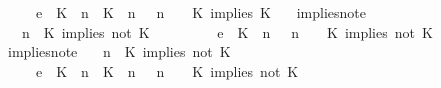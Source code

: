 \begin{isabellebody}
\ \ \ \ \ {\isasymhookrightarrow}\isactrlsub e\ \ {\isacharparenleft}{\isacharparenleft}{\isacharparenleft}K\ {\isasymUp}\ n{\isacharparenright}\ {\isacharhash}\ {\isacharparenleft}K\ {\isasymUp}\ n{\isacharparenright}\ {\isacharhash}\ {\isasymGamma}{\isacharparenright}{\isacharcomma}\ n\ {\isasymturnstile}\ {\isasymPsi}\ {\isasymtriangleright}\ {\isacharparenleft}{\isacharparenleft}K\ implies\ K\ {\isacharhash}\ {\isasymPhi}{\isacharparenright}{\isacharparenright}{\isachardoublequoteclose}\isanewline
{\isacharbar}\ implies{\isacharunderscore}not{\isacharunderscore}e{}{\isacharcolon}\isanewline
\ \ {\isachardoublequoteopen}{\isacharparenleft}{\isasymGamma}{\isacharcomma}\ n\ {\isasymturnstile}\ {\isacharparenleft}{\isacharparenleft}K\ implies\ not\ K\ {\isacharhash}\ {\isasymPsi}{\isacharparenright}\ {\isasymtriangleright}\ {\isasymPhi}{\isacharparenright}\isanewline
\ \ \ \ \ {\isasymhookrightarrow}\isactrlsub e\ \ {\isacharparenleft}{\isacharparenleft}{\isacharparenleft}K\ {\isasymnot}{\isasymUp}\ n{\isacharparenright}\ {\isacharhash}\ {\isasymGamma}{\isacharparenright}{\isacharcomma}\ n\ {\isasymturnstile}\ {\isasymPsi}\ {\isasymtriangleright}\ {\isacharparenleft}{\isacharparenleft}K\ implies\ not\ K\ {\isacharhash}\ {\isasymPhi}{\isacharparenright}{\isacharparenright}{\isachardoublequoteclose}\isanewline
{\isacharbar}\ implies{\isacharunderscore}not{\isacharunderscore}e{}{\isacharcolon}\isanewline
\ \ {\isachardoublequoteopen}{\isacharparenleft}{\isasymGamma}{\isacharcomma}\ n\ {\isasymturnstile}\ {\isacharparenleft}{\isacharparenleft}K\ implies\ not\ K\ {\isacharhash}\ {\isasymPsi}{\isacharparenright}\ {\isasymtriangleright}\ {\isasymPhi}{\isacharparenright}\isanewline
\ \ \ \ \ {\isasymhookrightarrow}\isactrlsub e\ \ {\isacharparenleft}{\isacharparenleft}{\isacharparenleft}K\ {\isasymUp}\ n{\isacharparenright}\ {\isacharhash}\ {\isacharparenleft}K\ {\isasymnot}{\isasymUp}\ n{\isacharparenright}\ {\isacharhash}\ {\isasymGamma}{\isacharparenright}{\isacharcomma}\ n\ {\isasymturnstile}\ {\isasymPsi}\ {\isasymtriangleright}\ {\isacharparenleft}{\isacharparenleft}K\ implies\ not\ K\ {\isacharhash}\ {\isasymPhi}{\isacharparenright}{\isacharparenright}{\isachardoublequoteclose}\isanewline

\end{isabellebody}
